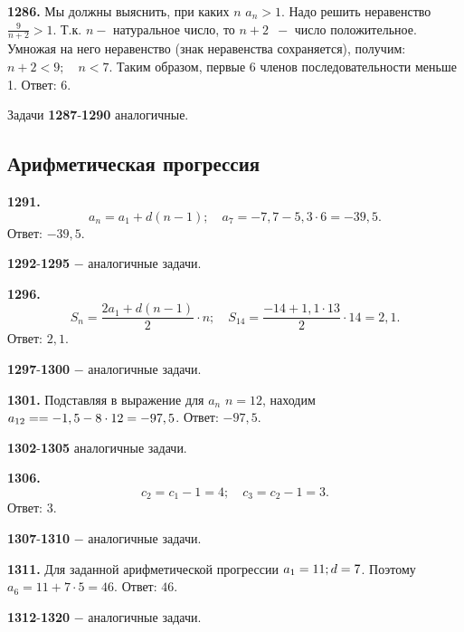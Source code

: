 \textbf{1286.} Мы должны выяснить, при каких $n$ $a_n>1$. Надо решить неравенство $\frac{9}{n+2}>1$. Т.к. $n-$ натуральное число, то $n+2\enspace-$ число положительное. Умножая на него неравенство (знак неравенства сохраняется), получим: $n+2<9;\quad n<7$. Таким образом, первые 6 членов последовательности меньше 1. \newline \null \hspace*{\fill} Ответ: 6. 

Задачи \textbf{1287}-\textbf{1290} аналогичные.

\subsection{Арифметическая прогрессия}


\textbf{1291.} $$a_n=a_1+d(n-1);\quad a_7=-7,7-5,3\cdot6=-39,5.$$ \newline \null \hspace*{\fill} Ответ: $-39,5$. 

\textbf{1292}-\textbf{1295} $-$ аналогичные задачи.

\textbf{1296.} $$S_n=\frac{2a_1+d(n-1)}{2}\cdot n;\quad S_{14}=\frac{-14+1,1\cdot13}{2}\cdot14=2,1.$$ \newline \null \hspace*{\fill} Ответ: $2,1$. 

\textbf{1297}-\textbf{1300} $-$ аналогичные задачи.

\textbf{1301.} Подставляя в выражение для $a_n$ $n=12$, находим $a_{12}=\linebreak=-1,5-8\cdot12=-97,5$. \newline \null \hspace*{\fill} Ответ: $-97,5$. 

\textbf{1302}-\textbf{1305}  аналогичные задачи.

\textbf{1306.} $$c_2=c_1-1=4;\quad c_3=c_2-1=3.$$ \newline \null \hspace*{\fill} Ответ: $3$.

\textbf{1307}-\textbf{1310} $-$ аналогичные задачи.

\textbf{1311.} Для заданной арифметической прогрессии $a_1=11;\linebreak d=7$. Поэтому $a_6=11+7\cdot5=46$. \newline \null \hspace*{\fill} Ответ: $46$. 

\textbf{1312}-\textbf{1320} $-$ аналогичные задачи.


